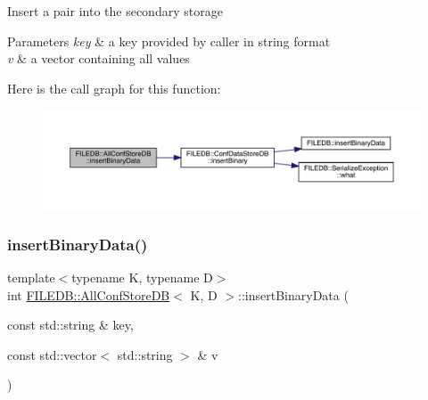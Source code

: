 Insert a pair into the secondary storage 
\begin{DoxyParams}{Parameters}
{\em key} & a key provided by caller in string format \\
\hline
{\em v} & a vector containing all values \\
\hline
\end{DoxyParams}
Here is the call graph for this function\+:
\nopagebreak
\begin{figure}[H]
\begin{center}
\leavevmode
\includegraphics[width=350pt]{df/db6/classFILEDB_1_1AllConfStoreDB_ac2c898624d4b32c526951edfb6271d60_cgraph}
\end{center}
\end{figure}
\mbox{\label{classFILEDB_1_1AllConfStoreDB_ac2c898624d4b32c526951edfb6271d60}} 
\subsubsection{\texorpdfstring{insertBinaryData()}{insertBinaryData()}\hspace{0.1cm}{\footnotesize\ttfamily [2/3]}}
{\footnotesize\ttfamily template$<$typename K, typename D$>$ \\
int \mbox{\hyperlink{classFILEDB_1_1AllConfStoreDB}{F\+I\+L\+E\+D\+B\+::\+All\+Conf\+Store\+DB}}$<$ K, D $>$\+::insert\+Binary\+Data (\begin{DoxyParamCaption}\item[{const std\+::string \&}]{key,  }\item[{const std\+::vector$<$ std\+::string $>$ \&}]{v }\end{DoxyParamCaption})\hspace{0.3cm}{\ttfamily [inline]}}

